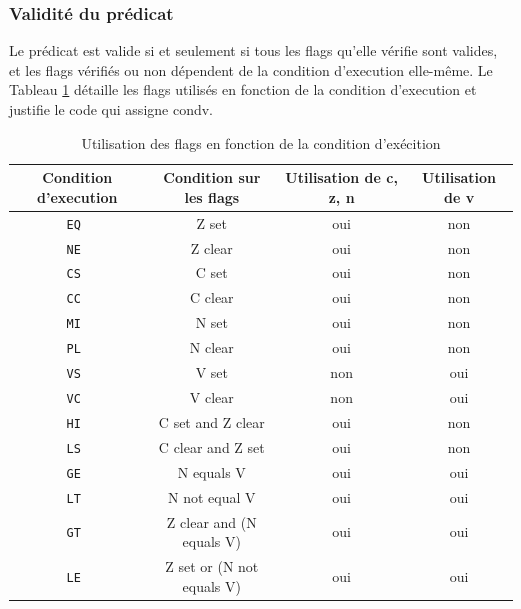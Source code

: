 \documentclass{article}
\begin{document}
\subsubsection{Validité du prédicat}
Le prédicat est valide si et seulement si tous les flags qu'elle vérifie sont valides,
et les flags vérifiés ou non dépendent de la condition d'execution elle-même.
Le Tableau \ref{cond} détaille les flags utilisés en fonction de la condition d'execution
et justifie le code qui assigne condv.

\begin{table}[H]
\centering
\begingroup
\setlength{\tabcolsep}{5pt}
\renewcommand{\arraystretch}{1.1}
\begin{tabular}{ | c | c | c | c | }
\hline
Condition d'execution  & Condition sur les flags & Utilisation de c, z, n  & Utilisation de v \\
\hline
\tt{EQ}      & Z set                       & oui & non \\
\hline
\tt{NE}      & Z clear                     & oui & non \\
\hline
\tt{CS}      & C set                       & oui & non \\
\hline
\tt{CC}      & C clear                     & oui & non \\
\hline
\tt{MI}      & N set                       & oui & non \\
\hline
\tt{PL}      & N clear                     & oui & non \\
\hline
\tt{VS}      & V set                       & non & oui \\
\hline
\tt{VC}      & V clear                     & non & oui \\
\hline
\tt{HI}      & C set and Z clear           & oui & non \\
\hline
\tt{LS}      & C clear and Z set           & oui & non \\
\hline
\tt{GE}      & N equals V                  & oui & oui \\
\hline
\tt{LT}      & N not equal V               & oui & oui \\
\hline
\tt{GT}      & Z clear and (N equals V)    & oui & oui \\
\hline
\tt{LE}      & Z set or (N not equals V)   & oui & oui \\
\hline
\end{tabular}
\endgroup
\caption{Utilisation des flags en fonction de la condition d'exécition}
\label{cond}
\end{table}
\end{document}
